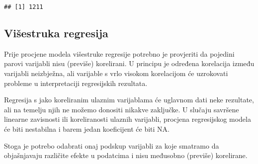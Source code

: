 \documentclass[
]{article}
\newenvironment{Shaded}{\begin{snugshade}}{\end{snugshade}}
\newcommand{\FunctionTok}[1]{\textcolor[rgb]{0.00,0.00,0.00}{#1}}
\newcommand{\NormalTok}[1]{#1}
\newcommand{\OtherTok}[1]{\textcolor[rgb]{0.56,0.35,0.01}{#1}}
\newcommand{\SpecialCharTok}[1]{\textcolor[rgb]{0.00,0.00,0.00}{#1}}
\newcommand{\StringTok}[1]{\textcolor[rgb]{0.31,0.60,0.02}{#1}}
\begin{document}
\begin{Shaded}
\end{Shaded}

\begin{verbatim}
## [1] 1211
\end{verbatim}

\hypertarget{viux161estruka-regresija}{%
\subsection{Višestruka regresija}\label{viux161estruka-regresija}}

Prije procjene modela višestruke regresije potrebno je provjeriti da
pojedini parovi varijabli nisu (previše) korelirani. U principu je
određena korelacija između varijabli neizbježna, ali varijable s vrlo
visokom korelacijom će uzrokovati probleme u interpretaciji regresijskih
rezultata.

Regresija s jako koreliranim ulaznim varijablama će uglavnom dati neke
rezultate, ali na temelju njih ne možemo donositi nikakve zaključke. U
slučaju savršene linearne zavisnosti ili koreliranosti ulaznih
varijabli, procjena regresijskog modela će biti nestabilna i barem jedan
koeficijent će biti NA.

Stoga je potrebo odabrati onaj podskup varijabli za koje smatramo da
objašnjavaju različite efekte u podatcima i nisu međusobno (previše)
korelirane.

\begin{Shaded}
\end{Shaded}
\end{document}
